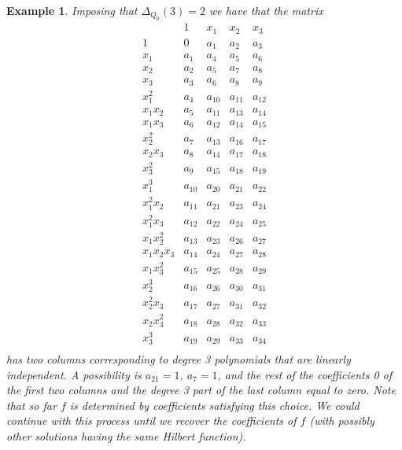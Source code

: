 \documentclass[a4paper,11p]{amsart}
\newtheorem{example0}[defn0]{Example}
\newenvironment{example}{ \begin{example0}\rm}{\end{example0}}
\begin{document}
\begin{example}
Imposing that $\Delta_{Q_0}(3)=2$ we have that the matrix 
{\small{
\[
\begin{array}{r|cccc}
& 1 & x_1 & x_2 & x_3\\
\hline 
1 & 0   & a_1 & a_2 & a_3\\
x_1 & a_1 & a_4 & a_5 & a_6 \\
x_2 & a_2 & a_5 & a_7 & a_8 \\
x_3 & a_3 & a_6 & a_8 & a_9 \\
x_1^2 & a_4 & a_{10} & a_{11} & a_{12} \\
x_1x_2 & a_5 & a_{11} & a_{13} & a_{14}\\
x_1x_3 & a_6 & a_{12} & a_{14} & a_{15}\\
x_2^2 & a_7 & a_{13} & a_{16} & a_{17} \\
x_2x_3 & a_8 & a_{14} & a_{17} & a_{18}\\
x_3^2 & a_9 & a_{15} & a_{18} & a_{19}\\
x_1^3 & a_{10} & a_{20} & a_{21} & a_{22}\\
x_1^2x_2 & a_{11} & a_{21} & a_{23} & a_{24}\\
x_1^2x_3 & a_{12} & a_{22} & a_{24} & a_{25}\\
x_1x_2^2 & a_{13} & a_{23} & a_{26} & a_{27}\\
x_1x_2x_3 & a_{14} & a_{24} & a_{27} & a_{28}\\
x_1x_3^2 & a_{15} & a_{25} & a_{28} & a_{29} \\
x_2^3 & a_{16} & a_{26} & a_{30} & a_{31} \\
x_2^2x_3 & a_{17} & a_{27} & a_{31} & a_{32}\\
x_2x_3^2 & a_{18} & a_{28} & a_{32} & a_{33} \\
x_3^3 & a_{19} & a_{29} & a_{33} & a_{34} \\
\end{array}\]
}}
has two columns corresponding to degree 3 polynomials that are linearly independent. A possibility is $a_{21}=1$, $a_7=1$, and the rest of the coefficients 0 of the first two columns and the degree 3 part of the last column equal to zero. Note that so far $f$ is determined by coefficients satisfying this choice. We could continue with this process until we recover the coefficients of $f$ (with possibly other solutions having the same Hilbert function).

\end{example}
\end{document}
